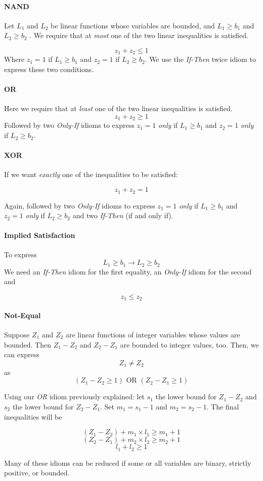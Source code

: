\paragraph{NAND \\} 

Let $L_1$ and $L_2$ be linear functions whose variables are bounded, and $L_1 \geq b_1$ and $L_2 \geq b_2$ . We require that
at \textit{most} one of the two linear inequalities is satisfied.

$$z_1 + z_2 \leq 1 $$
Where $z_1 = 1$ if $L_1 \geq b_1$ and $z_2 = 1$ if $L_2 \geq b_2$. We use the \textit{If-Then} twice idiom to express these two conditions.

\paragraph{OR \\}
Here we require that at \textit{least} one of the two linear inequalities is satisfied.
$$z_1 + z_2 \geq 1 $$
Followed by two \textit{Only-If} idioms to express $z_1 = 1$ \textit{only} if $L_1 \geq b_1$ and $z_2 = 1$ \textit{only} if $L_2 \geq b_2$.


\paragraph{XOR \\}
If we want \textit{exactly} one of the inequalities to be satisfied:

$$z_1 + z_2 = 1$$

Again, followed by two \textit{Only-If} idioms to express $z_1 = 1$ \textit{only} if $L_1 \geq b_1$ and $z_2 = 1$ \textit{only} if $L_2 \geq b_2$ and two \textit{If-Then} (if and only if).

\paragraph{Implied Satisfaction \\}
To express
$$ L_1 \geq b_1 \rightarrow L_2 \geq b_2$$
We need an \textit{If-Then} idiom for the first equality, an \textit{Only-If} idiom for the second and

$$z_1 \leq z_2$$

\paragraph{Not-Equal \\}

Suppose $Z_1$ and $Z_2$ are linear functions of integer variables whose values are bounded. Then $Z_1 - Z_2$ and $Z_2 - Z_1$ are bounded to integer values, too. Then, we can express
$$Z_1 \neq Z_2$$
as
$$(Z_1 - Z_2 \geq 1) \text{ OR } (Z_2 - Z_1 \geq 1) $$

Using our \textit{OR} idiom previously explained: let $s_1$ the lower bound for $Z_1 - Z_2$ and $s_2$ the lower bound for $Z_2 - Z_1$.
Set  $m_1 = s_1 - 1$ and $m_2 = s_2 - 1$. The final inequalities will be

$$(Z_1 - Z_2) + m_1 \times l_1 \geq m_1 + 1$$
$$(Z_2 - Z_1) + m_2 \times l_2 \geq m_2 + 1$$
$$ l_1 + l_2 \geq 1 $$

Many of these idioms can be reduced if some or all variables are binary, strictly positive, or bounded.